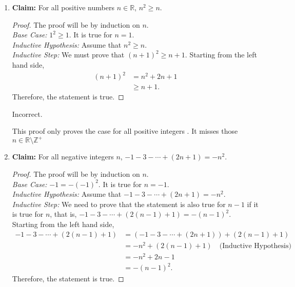 \documentclass{article}\usepackage{amsmath,amssymb,amsthm,tikz,tkz-graph,color,chngpage,soul,hyperref,csquotes,graphicx,floatrow, yfonts}\newcommand*{\QEDB}{\hfill\ensuremath{\square}}\newtheorem*{prop}{Proposition}\renewcommand{\theenumi}{\alph{enumi}}\usepackage[shortlabels]{enumitem}\usepackage[nobreak=true, framemethod=tikz]{mdframed}\usetikzlibrary{matrix,calc, automata, positioning}\MakeOuterQuote{"}\usepackage[margin=1in]{geometry} \newtheorem{theorem}{Theorem}
\begin{document}
\begin{enumerate}
    \item
        \textbf{Claim:} For all positive numbers $n \in \mathbb{R}$, $n^2 \ge n$.
        \begin{proof}
            The proof will be by induction on $n$.  \\
            \emph{Base Case:} $1^2 \ge 1$. It is true for $n=1$.    \\
            \emph{Inductive Hypothesis:} Assume that $n^2 \ge n$.   \\
            \emph{Inductive Step:} We must prove that $(n+1)^2 \ge n+1$.
            Starting from the left hand side,
            \begin{align*}
                (n+1)^2 &= n^2+2n+1 \\
                        &\ge n+1.
            \end{align*}
            Therefore, the statement is true.
        \end{proof}

    \begin{mdframed}
    Incorrect. \par
    This proof only proves the case for all positive integers . It misses those $n \in \mathbb{R} \setminus \mathbb{Z^+}$
    \end{mdframed}

    \item
        \textbf{Claim:} For all negative integers $n$, $-1-3-\cdots+(2n+1) = -n^2$.
        \begin{proof}
            The proof will be by induction on $n$.  \\
            \emph{Base Case:} $-1 = -(-1)^2$. It is true for $n=-1$. \\
            \emph{Inductive Hypothesis:} Assume that $-1-3-\cdots+(2n+1) = -n^2$. \\
            \emph{Inductive Step:} We need to prove that the statement is also true for $n-1$ if it is true for $n$, that is,
             $-1-3-\cdots+(2(n-1)+1) = -(n-1)^2$. Starting from the left hand side,
            \begin{align*}
                -1-3-\cdots+(2(n-1)+1)
                &= (-1-3-\cdots + (2n+1))+(2(n-1)+1)    \\
                &= -n^2 + (2(n-1)+1)                \quad \text{(Inductive Hypothesis)}\\
                &= -n^2 + 2n - 1                    \\
                &= -(n-1)^2.
            \end{align*}
            Therefore, the statement is true.
        \end{proof}


\end{enumerate}
\end{document}
